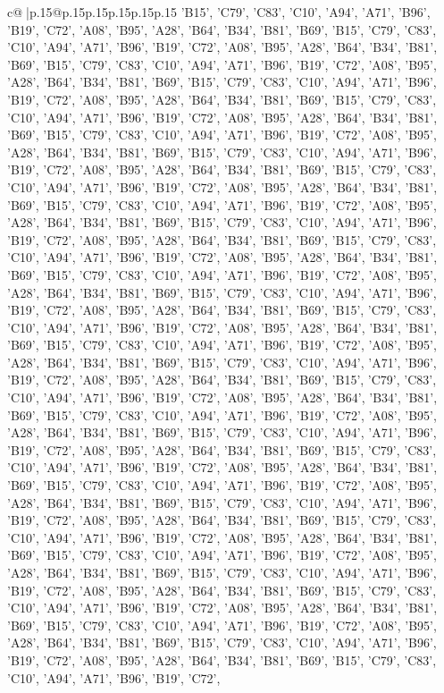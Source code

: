 \documentclass{article}
\begin{document}
{\begin{supertabular}{c@{$\;$}|p{.15\linewidth}@{}p{.15\linewidth}p{.15\linewidth}p{.15\linewidth}p{.15\linewidth}p{.15\linewidth}}
{{{'B15', 'C79', 'C83', 'C10', 'A94', 'A71', 'B96', 'B19', 'C72', 'A08', 'B95', 'A28', 'B64', 'B34', 'B81', 'B69', 'B15', 'C79', 'C83', 'C10', 'A94', 'A71', 'B96', 'B19', 'C72', 'A08', 'B95', 'A28', 'B64', 'B34', 'B81', 'B69', 'B15', 'C79', 'C83', 'C10', 'A94', 'A71', 'B96', 'B19', 'C72', 'A08', 'B95', 'A28', 'B64', 'B34', 'B81', 'B69', 'B15', 'C79', 'C83', 'C10', 'A94', 'A71', 'B96', 'B19', 'C72', 'A08', 'B95', 'A28', 'B64', 'B34', 'B81', 'B69', 'B15', 'C79', 'C83', 'C10', 'A94', 'A71', 'B96', 'B19', 'C72', 'A08', 'B95', 'A28', 'B64', 'B34', 'B81', 'B69', 'B15', 'C79', 'C83', 'C10', 'A94', 'A71', 'B96', 'B19', 'C72', 'A08', 'B95', 'A28', 'B64', 'B34', 'B81', 'B69', 'B15', 'C79', 'C83', 'C10', 'A94', 'A71', 'B96', 'B19', 'C72', 'A08', 'B95', 'A28', 'B64', 'B34', 'B81', 'B69', 'B15', 'C79', 'C83', 'C10', 'A94', 'A71', 'B96', 'B19', 'C72', 'A08', 'B95', 'A28', 'B64', 'B34', 'B81', 'B69', 'B15', 'C79', 'C83', 'C10', 'A94', 'A71', 'B96', 'B19', 'C72', 'A08', 'B95', 'A28', 'B64', 'B34', 'B81', 'B69', 'B15', 'C79', 'C83', 'C10', 'A94', 'A71', 'B96', 'B19', 'C72', 'A08', 'B95', 'A28', 'B64', 'B34', 'B81', 'B69', 'B15', 'C79', 'C83', 'C10', 'A94', 'A71', 'B96', 'B19', 'C72', 'A08', 'B95', 'A28', 'B64', 'B34', 'B81', 'B69', 'B15', 'C79', 'C83', 'C10', 'A94', 'A71', 'B96', 'B19', 'C72', 'A08', 'B95', 'A28', 'B64', 'B34', 'B81', 'B69', 'B15', 'C79', 'C83', 'C10', 'A94', 'A71', 'B96', 'B19', 'C72', 'A08', 'B95', 'A28', 'B64', 'B34', 'B81', 'B69', 'B15', 'C79', 'C83', 'C10', 'A94', 'A71', 'B96', 'B19', 'C72', 'A08', 'B95', 'A28', 'B64', 'B34', 'B81', 'B69', 'B15', 'C79', 'C83', 'C10', 'A94', 'A71', 'B96', 'B19', 'C72', 'A08', 'B95', 'A28', 'B64', 'B34', 'B81', 'B69', 'B15', 'C79', 'C83', 'C10', 'A94', 'A71', 'B96', 'B19', 'C72', 'A08', 'B95', 'A28', 'B64', 'B34', 'B81', 'B69', 'B15', 'C79', 'C83', 'C10', 'A94', 'A71', 'B96', 'B19', 'C72', 'A08', 'B95', 'A28', 'B64', 'B34', 'B81', 'B69', 'B15', 'C79', 'C83', 'C10', 'A94', 'A71', 'B96', 'B19', 'C72', 'A08', 'B95', 'A28', 'B64', 'B34', 'B81', 'B69', 'B15', 'C79', 'C83', 'C10', 'A94', 'A71', 'B96', 'B19', 'C72', 'A08', 'B95', 'A28', 'B64', 'B34', 'B81', 'B69', 'B15', 'C79', 'C83', 'C10', 'A94', 'A71', 'B96', 'B19', 'C72', 'A08', 'B95', 'A28', 'B64', 'B34', 'B81', 'B69', 'B15', 'C79', 'C83', 'C10', 'A94', 'A71', 'B96', 'B19', 'C72', 'A08', 'B95', 'A28', 'B64', 'B34', 'B81', 'B69', 'B15', 'C79', 'C83', 'C10', 'A94', 'A71', 'B96', 'B19', 'C72', 'A08', 'B95', 'A28', 'B64', 'B34', 'B81', 'B69', 'B15', 'C79', 'C83', 'C10', 'A94', 'A71', 'B96', 'B19', 'C72', 'A08', 'B95', 'A28', 'B64', 'B34', 'B81', 'B69', 'B15', 'C79', 'C83', 'C10', 'A94', 'A71', 'B96', 'B19', 'C72', 'A08', 'B95', 'A28', 'B64', 'B34', 'B81', 'B69', 'B15', 'C79', 'C83', 'C10', 'A94', 'A71', 'B96', 'B19', 'C72', 'A08', 'B95', 'A28', 'B64', 'B34', 'B81', 'B69', 'B15', 'C79', 'C83', 'C10', 'A94', 'A71', 'B96', 'B19', 'C72', 'A08', 'B95', 'A28', 'B64', 'B34', 'B81', 'B69', 'B15', 'C79', 'C83', 'C10', 'A94', 'A71', 'B96', 'B19', 'C72', 'A08', 'B95', 'A28', 'B64', 'B34', 'B81', 'B69', 'B15', 'C79', 'C83', 'C10', 'A94', 'A71', 'B96', 'B19', 'C72', 'A08', 'B95', 'A28', 'B64', 'B34', 'B81', 'B69', 'B15', 'C79', 'C83', 'C10', 'A94', 'A71', 'B96', 'B19', 'C72', }}}
\end{supertabular}}
\end{document}
